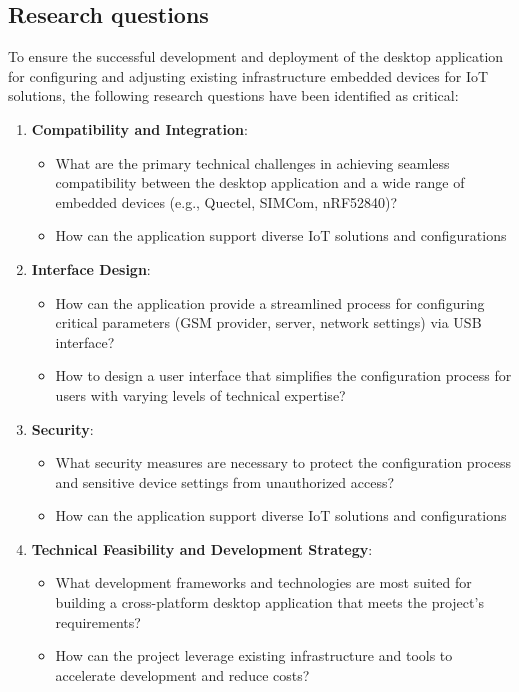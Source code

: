 \documentclass[a4paper, 11pt]{article}
\begin{document}
\subsection{Research questions}
To ensure the successful development and deployment of the desktop application for configuring and adjusting existing infrastructure embedded devices for IoT solutions, the following research questions have been identified as critical:
\begin{enumerate}
  \item \textbf{Compatibility and Integration}:
  \begin{itemize}
    \item What are the primary technical challenges in achieving seamless compatibility between the desktop application and a wide range of embedded devices (e.g., Quectel, SIMCom, nRF52840)?
    \item How can the application support diverse IoT solutions and configurations
\end{itemize}
  \item \textbf{Interface Design}:
  \begin{itemize}
    \item How can the application provide a streamlined process for configuring critical parameters (GSM provider, server, network settings) via USB interface?
    \item How to design a user interface that simplifies the configuration process for users with varying levels of technical expertise?
\end{itemize}
  \item \textbf{Security}:
  \begin{itemize}
    \item What security measures are necessary to protect the configuration process and sensitive device settings from unauthorized access?
    \item How can the application support diverse IoT solutions and configurations
\end{itemize}
  \item \textbf{Technical Feasibility and Development Strategy}:
  \begin{itemize}
    \item What development frameworks and technologies are most suited for building a cross-platform desktop application that meets the project's requirements?
    \item How can the project leverage existing infrastructure and tools to accelerate development and reduce costs?
\end{itemize}
\end{enumerate}
\end{document}
